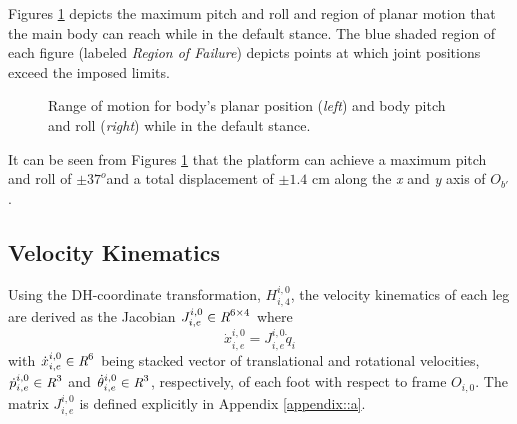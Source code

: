 			Figures \ref{fig::pos_and_ori_rom} depicts the maximum pitch and roll and region of planar motion that the main body can reach while in the default stance. The blue shaded region of each figure (labeled \emph{Region of Failure}) depicts points at which joint positions exceed the imposed limits.
			\begin{figure}[h!]
				\centering
				\caption{Range of motion for body's planar position (\emph{left}) and body pitch and roll (\emph{right}) while in the default stance.}
				\label{fig::pos_and_ori_rom}
			\end{figure}
			It can be seen from Figures \ref{fig::pos_and_ori_rom} that the platform can achieve a maximum pitch and roll of  $\pm37^o$and a total displacement of $\pm 1.4 \text{ cm}$ along the \emph{x} and \emph{y} axis of $O_{b'}$.


		\subsection{Velocity Kinematics}

			Using the DH-coordinate transformation, ${H}^{i,0}_{i,4}$, the velocity kinematics of each \Ith leg are derived as the Jacobian $J^{i,0}_{i,e} \in\emph{R}^{6\times4}$ where 
				\begin{equation}
					\dot{x}^{i,0}_{i,e} = J^{i,0}_{i,e}  \dot{q}_{i}
					\label{eq::leg_jacobian}
				\end{equation}
			with $\dot{x}^{i,0}_{i,e} \in\emph{R}^{6}$ being stacked vector of translational and rotational velocities, $\dot{p}_{i,e}^{i,0} \in\emph{R}^{3}$ and $\dot{\theta}_{i,e}^{i,0}\in\emph{R}^{3}$, respectively, of each \Ith foot with respect to frame $O_{i,0}$. The matrix $J^{i,0}_{i,e}$ is defined explicitly in Appendix \ref{appendix::a}.

